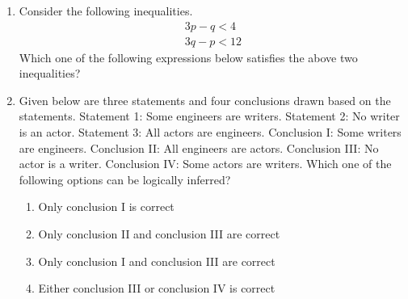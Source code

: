 \documentclass[journal,12pt,onecolumn]{IEEEtran}
\theoremstyle{remark}
\begin{document}
\begin{enumerate}
    \hfill{}
    \begin{enumerate}
    \end{enumerate}

    \item Consider the following inequalities.
    \begin{align*}
        3p - q < 4 \\
        3q - p < 12
    \end{align*}
    Which one of the following expressions below satisfies the above two inequalities?

    \hfill{}
    \begin{enumerate}
    \end{enumerate}

    \item Given below are three statements and four conclusions drawn based on the statements.
    Statement 1: Some engineers are writers.
    Statement 2: No writer is an actor.
    Statement 3: All actors are engineers.
    Conclusion I: Some writers are engineers.
    Conclusion II: All engineers are actors.
    Conclusion III: No actor is a writer.
    Conclusion IV: Some actors are writers.
    Which one of the following options can be logically inferred?

    \hfill{}
    \begin{enumerate}
        \item Only conclusion I is correct
        \item Only conclusion II and conclusion III are correct
        \item Only conclusion I and conclusion III are correct
        \item Either conclusion III or conclusion IV is correct
    \end{enumerate}


\end{enumerate}
\end{document}

